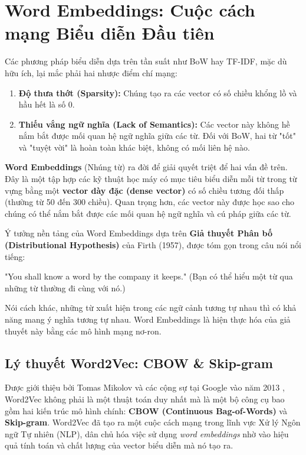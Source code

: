 
\section{Word Embeddings: Cuộc cách mạng Biểu diễn Đầu tiên}
\label{sec:word_embeddings}

Các phương pháp biểu diễn dựa trên tần suất như BoW hay TF-IDF, mặc dù hữu ích, lại mắc phải hai nhược điểm chí mạng:
\begin{enumerate}
    \item \textbf{Độ thưa thớt (Sparsity):} Chúng tạo ra các vector có số chiều khổng lồ và hầu hết là số 0.
    \item \textbf{Thiếu vắng ngữ nghĩa (Lack of Semantics):} Các vector này không hề nắm bắt được mối quan hệ ngữ nghĩa giữa các từ. Đối với BoW, hai từ "tốt" và "tuyệt vời" là hoàn toàn khác biệt, không có mối liên hệ nào.
\end{enumerate}

\textbf{Word Embeddings} (Nhúng từ) ra đời để giải quyết triệt để hai vấn đề trên. Đây là một tập hợp các kỹ thuật học máy có mục tiêu biểu diễn mỗi từ trong từ vựng bằng một \textbf{vector dày đặc (dense vector)} có số chiều tương đối thấp (thường từ 50 đến 300 chiều). Quan trọng hơn, các vector này được học sao cho chúng có thể nắm bắt được các mối quan hệ ngữ nghĩa và cú pháp giữa các từ.

Ý tưởng nền tảng của Word Embeddings dựa trên \textbf{Giả thuyết Phân bố (Distributional Hypothesis)} của Firth (1957), được tóm gọn trong câu nói nổi tiếng:
\begin{tcolorbox}[
    title=Giả thuyết Phân bố,
    colback=yellow!10!white, colframe=yellow!50!black, fonttitle=\bfseries
]
"You shall know a word by the company it keeps." (Bạn có thể hiểu một từ qua những từ thường đi cùng với nó.)
\end{tcolorbox}
Nói cách khác, những từ xuất hiện trong các ngữ cảnh tương tự nhau thì có khả năng mang ý nghĩa tương tự nhau. Word Embeddings là hiện thực hóa của giả thuyết này bằng các mô hình mạng nơ-ron.

\subsection{Lý thuyết Word2Vec: CBOW \& Skip-gram}
\label{ssec:word2vec}
Được giới thiệu bởi Tomas Mikolov và các cộng sự tại Google vào năm 2013 \cite{mikolov2013efficient, mikolov2013distributed}, Word2Vec không phải là một thuật toán duy nhất mà là một bộ công cụ bao gồm hai kiến trúc mô hình chính: \textbf{CBOW (Continuous Bag-of-Words)} và \textbf{Skip-gram}. Word2Vec đã tạo ra một cuộc cách mạng trong lĩnh vực Xử lý Ngôn ngữ Tự nhiên (NLP), dân chủ hóa việc sử dụng \textit{word embeddings} nhờ vào hiệu quả tính toán và chất lượng của vector biểu diễn mà nó tạo ra.

